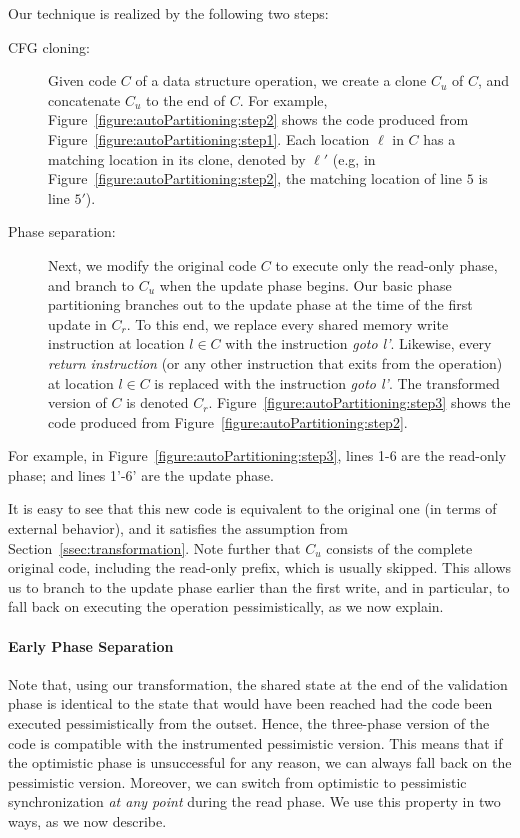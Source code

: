\noindent Our technique is realized by the following two steps:
\begin{description}
  \item [CFG cloning:]
Given code $C$ of a data structure operation, we create a clone $C_u$ of $C$, and concatenate $C_u$ to the end of $C$.
For example, Figure~\ref{figure:autoPartitioning:step2} shows the code produced from Figure~\ref{figure:autoPartitioning:step1}.
Each location $\ell$ in $C$ has a matching location in its clone, denoted by $\ell'$
(e.g, in Figure~\ref{figure:autoPartitioning:step2}, the matching location of line $5$ is line $5'$).
  \item [Phase separation:]
Next, we modify the original code $C$ to execute only the read-only phase, and branch to $C_u$ when the
update phase begins. Our basic phase partitioning branches out to the update phase at the time of the first update in $C_r$.
To this end, we replace every shared memory write instruction
at location $l \in C$ with the instruction \emph{goto l'}.
Likewise, every \emph{return instruction} (or any other instruction that exits from the operation)
at location $l \in C$ is replaced with the instruction \emph{goto l'}.
The transformed version of $C$ is denoted $C_r$.
Figure~\ref{figure:autoPartitioning:step3} shows the code produced from Figure~\ref{figure:autoPartitioning:step2}.
\end{description}


For example, in Figure~\ref{figure:autoPartitioning:step3}, lines 1-6 are the read-only phase; and lines 1'-6' are the update phase.

It is easy to see that this new code is equivalent to the original one (in terms of external behavior), and it satisfies the assumption from Section~\ref{ssec:transformation}. Note further that $C_u$ consists of the complete original code, including
the read-only prefix, which is usually skipped. This allows us to branch  to
the update phase earlier than the first write, and in particular, to fall back on executing the
operation pessimistically, as we now explain.

\paragraph{Early Phase Separation}
Note that, using our transformation, the shared state at the end of the validation phase
is identical to the state that would have been reached had the code been executed pessimistically from
the outset. Hence, the three-phase version of the code is compatible with the instrumented
pessimistic version. This means that if the optimistic phase is unsuccessful for any reason, we can always
fall back on the pessimistic version. Moreover, we can switch from optimistic to pessimistic synchronization
\emph{at any point} during the read phase.
We use this property in two ways, as we now describe.


